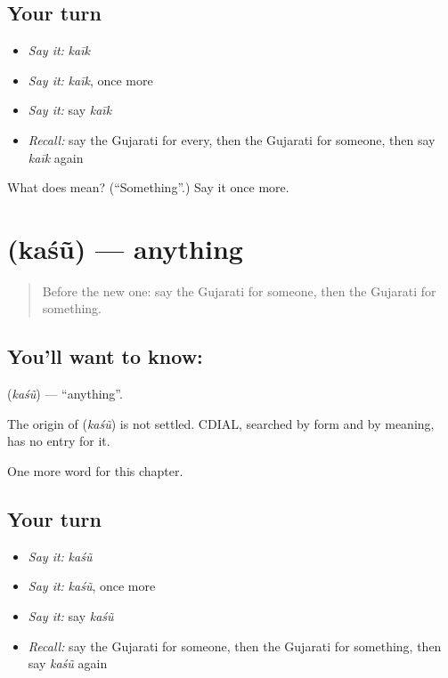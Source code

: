 \subsection*{Your turn}
\begin{itemize}
\raggedright
  \item \emph{Say it:} \emph{kaīk}
  \item \emph{Say it:} \emph{kaīk}, once more
  \item \emph{Say it:} say \emph{kaīk}
  \item \emph{Recall:} say the Gujarati for every, then the Gujarati for someone, then say \emph{kaīk} again
\end{itemize}

\begin{tcolorbox}[breakable,colback=teal!4,colframe=teal!35!black,title={Before you move on}]
What does  mean? (\textquotedblleft{}Something\textquotedblright{}.) Say it once more.
\end{tcolorbox}
\section[\texorpdfstring{\gu{કશું} (kaśũ)}{કશું (kaśũ)}]{ (kaśũ) — anything}

\label{lesson:GU-C100-kasu}



\begin{quote}
Before the new one: say the Gujarati for someone, then the Gujarati for something.
\end{quote}

\subsection*{You'll want to know: }
\textbf{} (\emph{kaśũ}) — \textquotedblleft{}anything\textquotedblright{}.

\begin{cousinweb}
The origin of \textbf{} (\emph{kaśũ}) is not settled. CDIAL, searched by form and by meaning, has no entry for it.
\end{cousinweb}

\begin{grammarlens}[title={What you've built}]
One more word for this chapter.
\end{grammarlens}

\subsection*{Your turn}
\begin{itemize}
\raggedright
  \item \emph{Say it:} \emph{kaśũ}
  \item \emph{Say it:} \emph{kaśũ}, once more
  \item \emph{Say it:} say \emph{kaśũ}
  \item \emph{Recall:} say the Gujarati for someone, then the Gujarati for something, then say \emph{kaśũ} again
\end{itemize}

